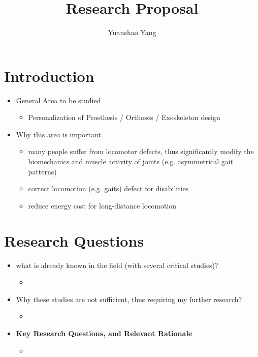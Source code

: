 \documentclass[8pt]{article}
\title{Research Proposal}
\author{Yuanshao Yang}
\affil{Department of Mechanical Engineering, Univereity of Michigan}
\date{}
\begin{document}
\maketitle


\section{Introduction}
\begin{itemize}
    \item General Area to be studied
    \begin{itemize}
        \item Personalization of Prosthesis / Orthoses / Exoskeleton design \cite{PersonalizeMain}
    \end{itemize}
    \item Why this area is important
    \begin{itemize}
        \item many people suffer from locomotor defects, thus significantly modify the biomechanics and muscle activity of joints (e.g. asymmetrical gait patterns) \cite{GaitAdjustment}
        \item correct locomotion (e.g. gaits) defect for disabilities \cite{GaitCorrection}
        \item reduce energy cost for long-distance locomotion \cite{ReduceEnergyCost}
    \end{itemize}
\end{itemize}



\section{Research Questions}

\begin{itemize}
    \item what is already known in the field (with several critical studies)?
    
    \begin{itemize}
        \item 
    \end{itemize}
    
    \item Why these studies are not sufficient, thus requiring my further research?
    
    \begin{itemize}
        \item 
    \end{itemize}
    
    \item \textbf{Key Research Questions, and Relevant Rationale}
    
    \begin{itemize}
        \item 
    \end{itemize}

\end{itemize}
\end{document}
